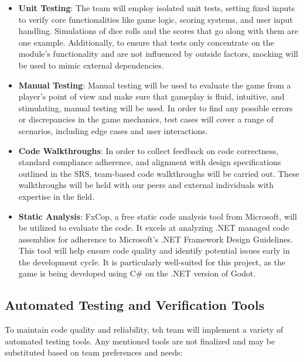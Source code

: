 \documentclass[12pt, titlepage]{article}
\begin{document}
\begin{itemize}
  \item \textbf{Unit Testing}: The team will employ isolated unit tests, setting fixed inputs to verify core functionalities like game logic, scoring systems, and user input handling.  Simulations of dice rolls and the scores that go along with them are one example. Additionally, to ensure that tests only concentrate on the module's functionality and are not influenced by outside factors, mocking will be used to mimic external dependencies.
  \item \textbf{Manual Testing}: Manual testing will be used to evaluate the game from a player's point of view and make sure that gameplay is fluid, intuitive, and stimulating, manual testing will be used. In order to find any possible errors or discrepancies in the game mechanics, test cases will cover a range of scenarios, including edge cases and user interactions.
  \item \textbf{Code Walkthroughs}: In order to collect feedback on code correctness, standard compliance adherence, and alignment with design specifications outlined in the SRS, team-based code walkthroughs will be carried out. These walkthroughs will be held with our peers and external individuals with expertise in the field.
  \item \textbf{Static Analysis}: FxCop, a free static code analysis tool from Microsoft, will be utilized to evaluate the code. It excels at analyzing .NET managed code assemblies for adherence to Microsoft's .NET Framework Design Guidelines. This tool will help ensure code quality and identify potential issues early in the development cycle. It is particularly well-suited for this project, as the game is being developed using C\# on the .NET version of Godot.
\end{itemize}

\subsection{Automated Testing and Verification Tools}

\noindent To maintain code quality and reliability, teh team will implement a variety of automated testing tools. Any mentioned tools are not finalized and may be substituted based on team preferences and needs:
\end{document}

